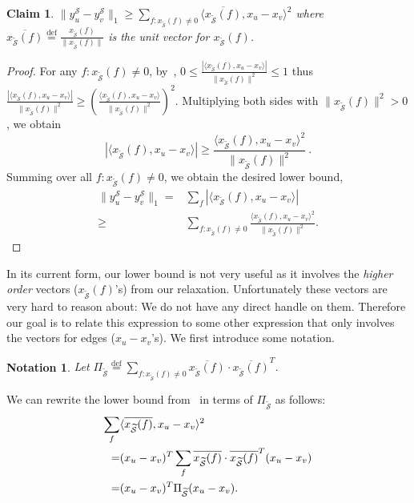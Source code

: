 \documentclass{article}
\def\triangleq{\overset{\mathrm{def}}{=}}
\newtheorem{claim}{Claim}[section]
\newtheorem{notation}{Notation}[section]
\newcommand{\unit}[1]{\overline{#1}}
\newcommand{\xvec}{\vec{x}} \newcommand{\yvec}{\vec{y}} \newcommand{\xmat}{\vec{X}} \newcommand{\ymat}{\vec{Y}} \newcommand{\zmat}{\vec{Z}}
\def\vec{}
\newcommand{\sde}{{\mathcal{S}}}
\newcommand{\sdn}{{\widetilde{\mathcal{S}}}}
\begin{document}
\begin{claim}\label{clm:l1-lb}
  $\| \yvec^\sde_u - \yvec^\sde_v \|_1 \ge \sum_{f:
    \xvec_{\sdn}(f)\neq 0} \langle \unit{\xvec_\sdn(f)}, \xvec_u -
  \xvec_v \rangle^2$ where $\unit{\xvec_\sdn(f)} \triangleq
  \frac{\xvec_\sdn(f)}{\|\xvec_\sdn(f)\|}$ is the unit vector for
  $\xvec_{\sdn}(f)$.
\end{claim}
\begin{proof}
For any $f: \xvec_{\sdn}(f)\neq 0$, 
by~, $0\le \frac { \left|\langle {\xvec_\sdn(f)},
    \xvec_u - \xvec_v \rangle \right|} { \|\xvec_{\sdn}(f)\|^2 } \le
1$ thus
$\frac { \left|\langle {\xvec_\sdn(f)}, \xvec_u - \xvec_v \rangle
  \right|} { \|\xvec_{\sdn}(f)\|^2 } \ge \left( \frac { \langle
    {\xvec_\sdn(f)}, \xvec_u - \xvec_v \rangle } {
    \|\xvec_{\sdn}(f)\|^2 } \right)^2$.  
Multiplying both sides with
$\|\xvec_{\sdn}(f)\|^2>0$, we obtain
\[ \left|\langle {\xvec_\sdn(f)}, \xvec_u - \xvec_v \rangle \right|
\ge \frac{\langle {\xvec_\sdn(f)}, \xvec_u - \xvec_v \rangle^2}{
  \|\xvec_{\sdn}(f)\|^2} \ . \]
Summing over all $f: \xvec_{\sdn}(f)\neq 0$, we obtain the desired lower
bound,
\begin{align*}
  \|\yvec^\sde_u - \yvec^\sde_v\|_1 = &
  \sum_f \left|\langle {\xvec_\sdn(f)}, \xvec_u - \xvec_v \rangle \right| \\
  \ge& \sum_{f:\xvec_{\sdn}(f)\neq 0} \frac{\langle {\xvec_\sdn(f)},
    \xvec_u - \xvec_v \rangle^2}{ \|\xvec_{\sdn}(f)\|^2}.
  \tag*{\qedhere}
\end{align*}
\end{proof}
In its current form, our lower bound is not very useful as it involves
the {\em higher order} vectors ($\xvec_{\sdn}(f)$'s) from our
relaxation.  Unfortunately these vectors are very hard to reason
about: We do not have any direct handle on them.  Therefore our goal
is to relate this expression to some other expression that only
involves the vectors for edges ($\xvec_u-\xvec_v$'s). We first
introduce some notation.
\begin{notation}
  Let $ \Pi_\sdn \triangleq \sum_{f: \xvec_\sdn(f)\neq 0}
  \unit{\xvec_\sdn(f)} \cdot \unit{\xvec_\sdn(f)}^T$.
\end{notation}
We can rewrite the lower bound from~ 
in terms of $\Pi_{\sdn}$ as follows:
\begin{align}
  \sum_f & \langle \unit{\xvec_\sdn(f)}, \xvec_u - \xvec_v \rangle^2 \notag \\
  = & (\xvec_u - \xvec_v)^T \sum_f \unit{\xvec_\sdn(f)} \cdot
  \unit{\xvec_\sdn(f)}^T
  (\xvec_u - \xvec_v) \notag \\
  =& (\xvec_u - \xvec_v)^T \Pi_{\sdn} (\xvec_u - \xvec_v).
\label{eq:601-7112}
\end{align}
\end{document}

